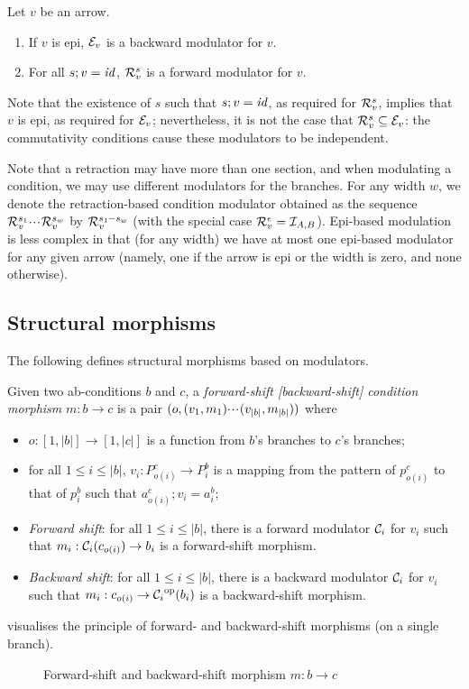 \begin{proposition}
Let $v$ be an arrow.
\begin{enumerate}
\item If $v$ is epi, $\mathcal{E}_v$ is a backward modulator for $v$.
\item For all $s;v=\mathit{id}$, $\mathcal{R}_v^s$ is a forward modulator for $v$.
\end{enumerate}
\end{proposition}
%
Note that the existence of $s$ such that $s;v=\mathit{id}$, as required for $\mathcal{R}_v^s$, implies that $v$ is epi, as required for $\mathcal{E}_v$; nevertheless, it is not the case that $\mathcal{R}_v^s\subseteq\mathcal{E}_v$: the commutativity conditions cause these modulators to be independent.

Note that a retraction may have more than one section, and when modulating a condition, we may use different modulators for the branches. For any width $w$, we denote the retraction-based condition modulator obtained as the sequence $\mathcal{R}_v^{s_1}{\cdotp\mkern-2mu\cdotp\mkern-2mu\cdotp\mkern1mu} \mathcal{R}_v^{s_w}$ by $\mathcal{R}_v^{s_1{\cdotp\mkern-2mu\cdotp\mkern-2mu\cdotp\mkern1mu} s_w}$ (with the special case $\mathcal{R}_v^\epsilon=\mathcal{I}_{A,B}$). Epi-based modulation is less complex in that (for any width) we have at most one epi-based modulator for any given arrow (namely, one if the arrow is epi or the width is zero, and none otherwise).

\subsection{Structural morphisms}

The following defines structural morphisms based on modulators.

\begin{definition}
  Given two ab-conditions $b$ and $c$, a \emph{forward-shift [backward-shift] condition morphism} $m: b \to c$ is a pair $(o,(v_1,m_1){\cdotp\mkern-2mu\cdotp\mkern-2mu\cdotp\mkern1mu} (v_{|b|},m_{|b|}))$ where
  \begin{itemize}
  \item $o:[1,|b|]\to[1,|c|]$ is a function from $b$'s branches to $c$'s branches;
  \item for all $1\leq i\leq |b|$, $v_i:P^c_{o(i)}\to P^b_i$ is a mapping from the pattern of $p^c_{o(i)}$ to that of $p^b_i$ such that $a^c_{o(i)};v_i=a^b_i$;
  \item\emph{Forward shift}: for all $1\leq i\leq |b|$, there is a forward modulator $\mathcal{C}_i$ for $v_i$ such that $m_i:{\mathcal{C}_i}(c_{o(i)})\to b_i$ is a forward-shift morphism.
  \item\emph{Backward shift}: for all $1\leq i\leq |b|$, there is a backward modulator $\mathcal{C}_i$ for $v_i$ such that $m_i:c_{o(i)}\to {\mathcal{C}_i}^{\mathrm{op}}(b_i)$ is a backward-shift morphism.
  \end{itemize}
\end{definition}
%
 visualises the principle of forward- and backward-shift morphisms (on a single branch).
%
\begin{figure}
\centering

\caption{Forward-shift and backward-shift morphism $m:b\to c$}
\end{figure}

